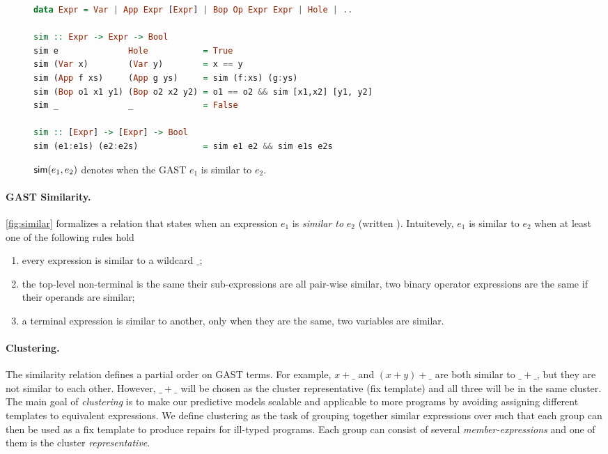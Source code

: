 \label{subsec:clustering}
\begin{figure*}
\begin{minipage}{\textwidth}
\begin{lstlisting}[language=haskell, frame=single]
data Expr = Var | App Expr [Expr] | Bop Op Expr Expr | Hole | ..

sim :: Expr -> Expr -> Bool
sim e              Hole           = True
sim (Var x)        (Var y)        = x == y
sim (App f xs)     (App g ys)     = sim (f:xs) (g:ys)
sim (Bop o1 x1 y1) (Bop o2 x2 y2) = o1 == o2 && sim [x1,x2] [y1, y2]
sim _              _              = False

sim :: [Expr] -> [Expr] -> Bool
sim (e1:e1s) (e2:e2s)             = sim e1 e2 && sim e1s e2s
\end{lstlisting}
\end{minipage}
\caption{$\mathsf{sim}(e_1, e_2)$ denotes when the GAST $e_1$ is similar to $e_2$.}
\label{fig:similar}
\end{figure*}

\paragraph{GAST Similarity.}
%
\autoref{fig:similar} formalizes a relation that states when
an expression $e_1$ is \emph{similar to} $e_2$  (written ).
%
Intuitevely, $e_1$ is similar to $e_2$ when at least one of the following rules
hold
\begin{enumerate}
    \item every expression is similar to a wildcard $\_$;

    \item the top-level non-terminal is the same their sub-expressions are all
          pair-wise similar, \eg two binary operator expressions are the same if
          their operands are similar;

    \item a terminal expression is similar to another, only when they are the
    same, \eg two variables are similar.
\end{enumerate}
%

\paragraph{Clustering.}
The similarity relation defines a partial order on GAST terms. For example, $x +
\_$ and $(x + y) + \_$ are both similar to $\_ + \_$, but they are not similar
to each other.
%
However, $\_ + \_$ will be chosen as the cluster representative (fix template)
and all three will be in the same cluster.
%
The main goal of \emph{clustering} is to make our predictive models scalable and
applicable to more programs by avoiding assigning different templates to
equivalent expressions. We define clustering as the task of grouping together
similar expressions over \repairLang such that each group can then be used as a
fix template to produce repairs for ill-typed programs. Each group can consist
of several \emph{member-expressions} and one of them is the cluster
\emph{representative}.

